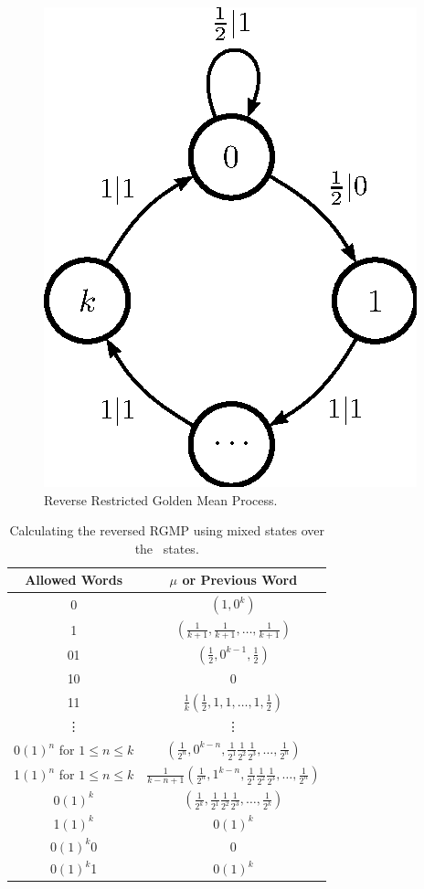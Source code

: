 \documentclass[prl,twocolumn,showpacs,superscriptaddress,preprintnumbers,floatfix]{revtex4}
\theoremstyle{plain}   \newtheorem{Lem}{Lemma}
\theoremstyle{plain} 	\newtheorem{Cor}{Corollary}
\theoremstyle{plain} 	\newtheorem{The}{Theorem}
\theoremstyle{plain} 	\newtheorem{Prop}{Proposition}
\theoremstyle{plain} 	\newtheorem*{Conj}{Conjecture}
\theoremstyle{plain}	\newtheorem*{Rem}{Remark}
\theoremstyle{plain}	\newtheorem*{Def}{Definition}
\theoremstyle{plain}	\newtheorem*{Not}{Notation}
\begin{document}
\begin{figure}[th]
\begin{center}
\includegraphics{restrictedgm_reM_ur.eps}
\caption{Reverse Restricted Golden Mean Process.}
\label{fig:ReverseRestrictedGM}
\end{center}
\end{figure}

\begin{table}
\begin{center}
\begin{tabular}{|c|c|}
\hline
Allowed Words & $\mu$ or Previous Word\\
\hline
0 & $(1, 0^k)$\\
1 & $(\frac{1}{k+1}, \frac{1}{k+1}, \ldots, \frac{1}{k+1})$\\
01 & $(\frac{1}{2}, 0^{k-1}, \frac{1}{2})$\\
10 & 0\\
11 & $\frac{1}{k}(\frac{1}{2},1,1,\ldots,1,\frac{1}{2})$\\
\vdots & \vdots \\
0$(1)^n$ for $1 \leq n \leq k$ & $(\frac{1}{2^{n}}, 0^{k-n}, \frac{1}{2^1} \frac{1}{2^2} \frac{1}{2^3}, \ldots,  \frac{1}{2^{n}})$\\
1$(1)^n$ for $1 \leq n \leq k$ & $\frac{1}{k-n+1}(\frac{1}{2^{n}}, 1^{k-n}, \frac{1}{2^1} \frac{1}{2^2} \frac{1}{2^3}, \ldots,  \frac{1}{2^{n}})$\\
0$(1)^{k}$ & $(\frac{1}{2^{k}}, \frac{1}{2^1} \frac{1}{2^2} \frac{1}{2^3}, \ldots,  \frac{1}{2^{k}})$\\
1$(1)^{k}$ & 0$(1)^{k}$\\
0$(1)^{k}$0 & 0\\
0$(1)^{k}$1 & 0$(1)^{k}$\\
\hline
\end{tabular}
\end{center}
\caption{Calculating the reversed RGMP using mixed states over the
  \eM\ states.
  }
\label{tab:RestrictedGMMixedStates}
\end{table}
\end{document}
